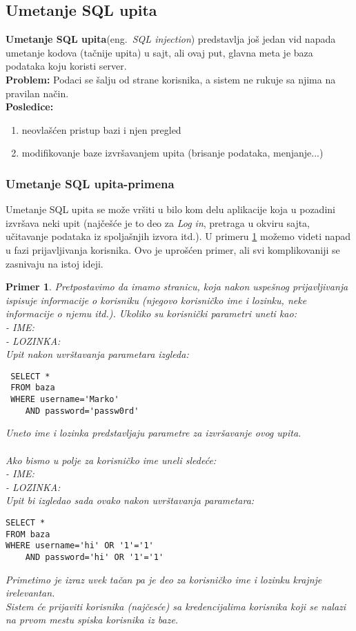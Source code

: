 \documentclass[a4paper]{article}
\newtheorem{primer}{Primer}[section]
\begin{document}
\subsection{Umetanje SQL upita}

\textbf{Umetanje SQL upita}(eng.~{\em SQL injection})\cite{SQL} predstavlja još jedan vid napada umetanje kodova (tačnije upita) u sajt, ali ovaj put, glavna meta je baza podataka koju koristi server.\\
\textbf{Problem:} Podaci se šalju od strane korisnika, a sistem ne rukuje sa njima na pravilan način.\\
\textbf{Posledice:} 
\begin{enumerate}
	\item neovlašćen pristup bazi i njen pregled
	\item modifikovanje baze izvršavanjem upita (brisanje podataka, menjanje...)
\end{enumerate}

\subsubsection{Umetanje SQL upita-primena}

Umetanje SQL upita se može vršiti u bilo kom delu aplikacije koja u pozadini izvršava neki upit (najčešće je to deo za \textit{Log in}, pretraga u okviru sajta, učitavanje podataka iz spoljašnjih izvora itd.). U primeru \ref{primer2} možemo videti napad u fazi prijavljivanja korisnika. Ovo je uprošćen primer, ali svi komplikovaniji se zasnivaju na istoj ideji.
\begin{primer}
\label{primer2}
Pretpostavimo da imamo stranicu, koja nakon uspešnog prijavljivanja ispisuje informacije o korisniku (njegovo korisničko ime i lozinku, neke informacije o njemu itd.). Ukoliko su korisnički parametri uneti kao:\\
- IME: \\
- LOZINKA: \\
Upit nakon uvrštavanja parametara izgleda:
\begin{lstlisting}
 SELECT * 
 FROM baza 
 WHERE username='Marko'
 	AND password='passw0rd'
\end{lstlisting}
Uneto ime i lozinka predstavljaju parametre za izvršavanje ovog upita.\\\\
Ako bismo u polje za korisničko ime uneli sledeće:\\
- IME: \\
- LOZINKA: \\
Upit bi izgledao sada ovako nakon uvrštavanja parametara:
\begin{lstlisting}
SELECT * 
FROM baza 
WHERE username='hi' OR '1'='1' 
	AND password='hi' OR '1'='1'
\end{lstlisting}
Primetimo je izraz  uvek tačan pa je deo za korisničko ime i lozinku krajnje irelevantan.\\
Sistem će prijaviti korisnika (najčesće) sa kredencijalima korisnika koji se nalazi na prvom mestu spiska korisnika iz baze.\\
\end{primer}
\end{document}
